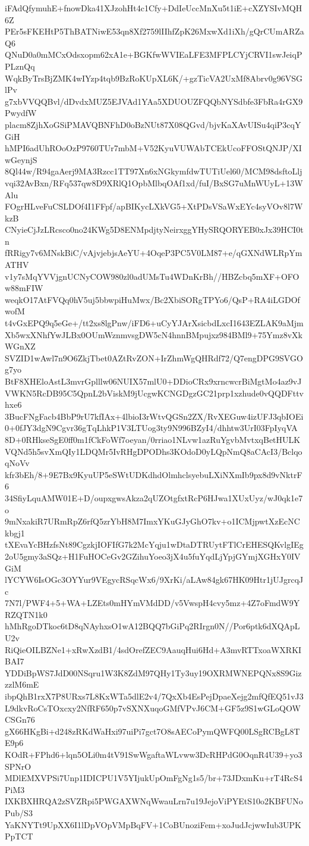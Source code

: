 iFAdQfymuhE+fnowDka41XJzohHt4c1Cfy+DdIeUccMnXu5t1iE+cXZYSIvMQH6Z
PEr5sFKEHtP5ThBATNiwE53qn8Xf2759lIIhfZpK26MxwXd1iXh/gQrCUmARZaQ6
QNuD0a0mMCxOdsxopm62xA1e+BGKfwWVIEaLFE3MFPLCYjCRVI1swJeiqPPLznQq
WqkByTrsBjZMK4wIYzp4tqb9BzRoKUpXL6K/+gzTicVA2UxMf8Abrv0g96VSGlPv
g7xbVVQQBvl/dDvdxMUZ5EJVAd1YAa5XDUOUZFQQbNYSdbfe3FbRa4rGX9PwydfW
placm8ZjhXoGSiPMAVQBNFhD0oBzNUt87X08QGvd/bjvKaXAvUISu4qiP3cqYGiH
hMPI6adUhROoOzP9760TUr7mbM+V52KyuVUWAbTCEkUcoFFOStQNJP/XIwGeynjS
8Ql44w/R94gaAerj9MA3Rzcc1TT97Xn6xNGkymfdwTUTiUel60/MCM98dsftoLlj
vqi32AvBxn/RFq537qw8D9XRlQ1OpbMlbqOAf1xd/fuI/BxSG7uMnWUyL+13WAlu
FOgrHLveFuCSLDOf4I1FFpf/apBIKycLXkVG5+XtPDsVSaWxEYc4syVOv8l7WkzB
CNyieCjJzLRcsco0no24KWg5D8ENMpdjtyNeirxggYHySRQORYEB0xJx39HCI0tn
fRRigy7v6MNskBiC/vAjvjebjsAeYU+4OqeP3PC5V0LM87+e/qGXNdWLRpYmATHV
v1y7sMqYVVjgnUCNyCOW980zl0adUMsTu4WDnKrBh//HBZcbq5mXF+OFOw88mFIW
weqkO17AtFVQq0hV5uj5bbwpiHuMwx/Bc2XbiSORgTPYo6/QsP+RA4iLGDOfwofM
t4vGxEPQ9q5eGe+/tt2xs8lgPnw/iFD6+uCyYJArXsicbdLxcI1643EZLAK9aMjm
Xb5wxXNhfYwJLBx0OUmWznmvsgDW5cN4hnnBMpujxz984BMl9+75Ymz8vXkWGnXZ
SVZID1wAwl7n9O6ZkjTbet0AZtRvZON+IrZhmWgQHRdf72/Q7engDPG9SVGOg7yo
BtF8XHEloAstL3mvrGplllw06NUIX57mlU0+DDioCRx9xrncwcrBiMgtMo4az9vJ
VWKN5RcDB95C5QpnL2bViskM9jUcgwKCNGDgzGC21prp1xzhude0vQQDFttvhxe6
3BucFNgFacb4BbP9rU7kfIAx+4lbioI3rWtvQGSn2ZX/RvXEGuw4izUFJ3qbIOEi
0+0fJY3dgN9Cgvr36gTqLhkP1V3LTUog3ty9N996BZyI4/dhhtw3UrI03FpIyqVA
8D+0RHkseSgE0ff0m1fCkFoWf7oeyan/0rriao1NLvw1azRuYgvbMvtxqBetHULK
VQNd5h5svXmQIy1LDQMr5IvRHgDPODhs3KOdoD0yLQpNmQ8aCAcI3/BclqoqNoVv
kfr3bEh/8+9E7Bx9KyuUP5eSWtUDKdhdOlmhclsyebuLXiNXmIb9px8d9vNktrF6
34SfiyLquAMW01E+D/oupxgwsAkza2qUZOtgfxtRcP6HJwa1XUxUyz/wJ0qk1e7o
9mNxakiR7URmRpZ6rfQ5zrYbH8M7ImxYKuGJyGhO7kv+o1ICMjpwtXzEcNCkbgj1
tXEvaYcBHzfsNt89CgzkjIOFIfG7k2McYqju1wDtaDTRUytFTlCrEHESQKvlgIEg
2oU5gmy3aSQz+H1FuHOCeGv2GZihuYoeo3jX4u5fuYqdLjYpjGYmjXGHxY0IVGiM
lYCYW6IsOGc3OYYur9VEgycRSqcWx6/9XrKi/aLAw84gk67HK09Htr1jUJgrcqJc
7N7l/PWF4+5+WA+LZEts0mHYmVMdDD/v5VwspH4cvy5mz+4Z7oFmdW9YRZQTN1k0
hMhRgoDTkoc6tD8qNAyhxsO1wA12BQQ7bGiPq2RIrgn0N//Por6ptk6dXQApLU2v
RiQieOILBZNe1+xRwXzdB1/4sdOrefZEC9AauqHui6Hd+A3mvRTTxoaWXRKIBAI7
YDDiBpWS7JdD00NSqru1W3K8ZdM97QHy1Ty3uy19OXRMWNEPQNx8S9GizzzlM6mE
ibpQhB1rxX7P8URxs7L8KxWTa5dlE2v4/7QxXb4EsPejDpaeXejg2mfQfEQ51vJ3
L9dkvRoCsTOxcxy2NfRF650p7vSXNXuqoGMfVPvJ6CM+GF5z9S1wGLoQOWCSGn76
gX66HKgBi+d248zRKdWaHxi97uiPi7gct7O8sAECoPymQWFQ00LSgRCBgL8TE9p6
KOdR+FPhd6+lqn5OLi0m4tV91SwWgaftaWLvww3DcRHPdG0OqnR4U39+yo3SPNrO
MDlEMXVPSi7Unp1IDICPU1V5YIjukUpOmFgNg1s5/br+73JDxmKu+rT4RcS4PiM3
IXKBXHRQA2zSVZRpi5PWGAXWNqWwauLrn7u19JejoViPYEtS10o2KBFUNoPub/S3
YaKNYTt9UpXX6I1lDpVOpVMpBqFV+1CoBUnoziFem+xoJudJcjwwIub3UPKPpTCT
